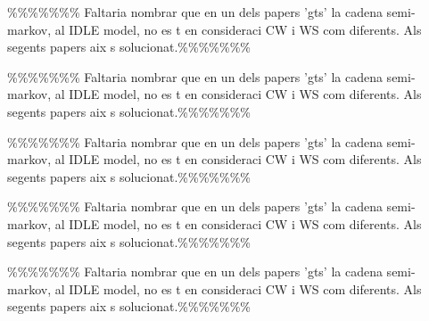 \%\%\%\%\%\%\% Faltaria nombrar que en un dels papers 'gts' la cadena semi-markov, al IDLE model, no es t en consideraci CW i WS com diferents. Als segents papers aix s solucionat.\%\%\%\%\%\%\%


\%\%\%\%\%\%\% Faltaria nombrar que en un dels papers 'gts' la cadena semi-markov, al IDLE model, no es t en consideraci CW i WS com diferents. Als segents papers aix s solucionat.\%\%\%\%\%\%\%


\%\%\%\%\%\%\% Faltaria nombrar que en un dels papers 'gts' la cadena semi-markov, al IDLE model, no es t en consideraci CW i WS com diferents. Als segents papers aix s solucionat.\%\%\%\%\%\%\%


\%\%\%\%\%\%\% Faltaria nombrar que en un dels papers 'gts' la cadena semi-markov, al IDLE model, no es t en consideraci CW i WS com diferents. Als segents papers aix s solucionat.\%\%\%\%\%\%\%


\%\%\%\%\%\%\% Faltaria nombrar que en un dels papers 'gts' la cadena semi-markov, al IDLE model, no es t en consideraci CW i WS com diferents. Als segents papers aix s solucionat.\%\%\%\%\%\%\%